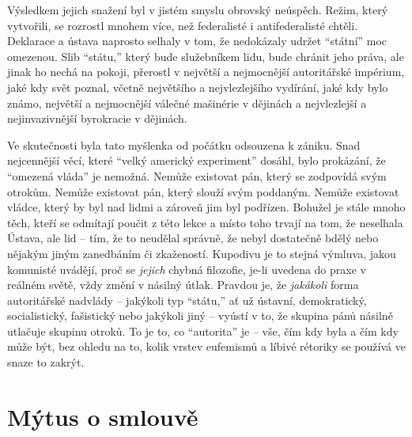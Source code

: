 \documentclass{book}
\begin{document}
Výsledkem jejich snažení byl v jistém smyslu obrovský neúspěch. Režim, který vytvořili, se rozrostl mnohem více, než federalisté i antifederalisté chtěli. Deklarace a ústava naprosto selhaly v tom, že nedokázaly udržet \enquote{státní} moc omezenou. Slib \enquote{státu,} který bude služebníkem lidu, bude chránit jeho práva, ale jinak ho nechá na pokoji, přerostl v největší a nejmocnější autoritářské impérium, jaké kdy svět poznal, včetně největšího a nejvlezlejšího vydírání, jaké kdy bylo známo, největší a nejmocnější válečné mašinérie v dějinách a nejvlezlejší a nejinvazivnější byrokracie v dějinách.

Ve skutečnosti byla tato myšlenka od počátku odsouzena k zániku. Snad nejcennější věcí, které \enquote{velký americký experiment} dosáhl, bylo prokázání, že \enquote{omezená vláda} je nemožná. Nemůže existovat pán, který se zodpovídá svým otrokům. Nemůže existovat pán, který slouží svým poddaným. Nemůže existovat vládce, který by byl nad lidmi a zároveň jim byl podřízen. Bohužel je stále mnoho těch, kteří se odmítají poučit z této lekce a místo toho trvají na tom, že neselhala Ústava, ale lid -- tím, že to neudělal správně, že nebyl dostatečně bdělý nebo nějakým jiným zanedbáním či zkažeností. Kupodivu je to stejná výmluva, jakou komunisté uvádějí, proč se \emph{jejich} chybná filozofie, je-li uvedena do praxe v reálném světě, vždy změní v násilný útlak. Pravdou je, že \emph{jakákoli} forma autoritářské nadvlády -- jakýkoli typ \enquote{státu,} ať už ústavní, demokratický, socialistický, fašistický nebo jakýkoli jiný -- vyústí v to, že skupina pánů násilně utlačuje skupinu otroků. To je to, co \enquote{autorita} je -- vše, čím kdy byla a čím kdy může být, bez ohledu na to, kolik vrstev eufemismů a líbivé rétoriky se používá ve snaze to zakrýt.

\section{Mýtus o smlouvě}
\end{document}
